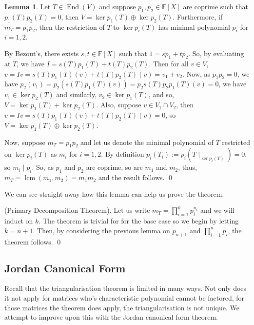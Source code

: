 \documentclass[
]{article}
\theoremstyle{definition}
\newtheorem{lemma}{Lemma}[section]
\theoremstyle{definition}
\begin{document}
\begin{lemma}
  Let \(T \in \mathop{\mathrm{End}}(V)\) and suppose \(p_1, p_2 \in \mathbb{F}[X]\) are coprime 
  such that \(p_1(T)p_2(T) = 0\), then \(V = \ker p_1(T) \oplus \ker p_2(T)\). 
  Furthermore, if \(m_T = p_1 p_2\), then the restriction of \(T\) to 
  \(\ker p_i(T)\) has minimal polynomial \(p_i\) for \(i = 1, 2\).
\end{lemma}
\proof

By Bezout's, there exists \(s, t \in \mathbb{F}[X]\) such that
\(1 = sp_1 + tp_2\). So, by evaluating at \(T\), we have
\(I = s(T)p_1(T) + t(T)p_2(T)\). Then for all \(v \in V\),
\(v = Iv = s(T)p_1(T)(v) + t(T)p_2(T)(v) = v_1 + v_2\). Now, as
\(p_1 p_2 = 0\), we have
\(p_2(v_1) = p_2(s(T)p_1(T)(v)) = p_2 s(T)p_2 p_1(T)(v) = 0\), we have
\(v_1 \in \ker p_2(T)\) and similarly, \(v_2 \in \ker p_1(T)\), and so,
\(V = \ker p_1(T) + \ker p_2(T)\). Also, suppose \(v \in V_1 \cap V_2\),
then \(v = Iv = s(T)p_1(T)(v) + t(T)p_2(T)(v) = 0\), so
\(V = \ker p_1(T) \oplus \ker p_2(T)\).

Now, suppose \(m_T = p_1 p_2\) and let us denote the minimal polynomial
of \(T\) restricted on \(\ker p_i(T)\) as \(m_i\) for \(i = 1, 2\). By
definition \(p_i(T_i) := p_i(T \mid_{\ker p_i(T)}) = 0\), so
\(m_i \mid p_i\). So, as \(p_1\) and \(p_2\) are coprime, so are \(m_1\)
and \(m_2\), thus, \(m_T = \mathop{\mathrm{lcm}}(m_1, m_2) = m_1 m_2\)
and the result follows. \qed

We can see straight away how this lemma can help us prove the theorem.

\proof (Primary Decomposition Theorem). Let us write
\(m_T = \prod_{i = 1}^k p_i^{n_i}\) and we will induct on \(k\). The
theorem is trivial for for the base case so we begin by letting
\(k = n + 1\). Then, by considering the previous lemma on \(p_{n + 1}\)
and \(\prod_{i = 1}^n p_i\), the theorem follows. \qed

\hypertarget{jordan-canonical-form}{%
\subsection{Jordan Canonical Form}\label{jordan-canonical-form}}

Recall that the triangularisation theorem is limited in many ways. Not
only does it not apply for matrices who's characteristic polynomial
cannot be factored, for those matrices the theorem does apply, the
triangularisation is not unique. We attempt to improve upon this with
the Jordan canonical form theorem.
\end{document}
